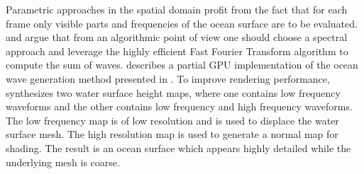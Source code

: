
Parametric approaches in the spatial domain profit from the fact
that for each frame only visible parts and frequencies of the ocean surface
are to be evaluated. \citet{Mitchell:2005} and \citet{Thon:2000}
argue that from an algorithmic point of view one should choose a spectral
approach and leverage the highly efficient Fast Fourier Transform algorithm
to compute the sum of waves. \citeauthor{Mitchell:2005} describes a
partial GPU implementation of the ocean wave generation method presented in
\citet{course:simulatingocean}. To improve rendering performance,
\citeauthor{Mitchell:2005} synthesizes two water surface height maps,
where one contains low frequency waveforms and the other contains
low frequency and high frequency waveforms. The low frequency map
is of low resolution and is used to displace the water surface mesh.
The high resolution map is used to generate a normal map for shading.
The result is an ocean surface which appears highly detailed
while the underlying mesh is coarse.


